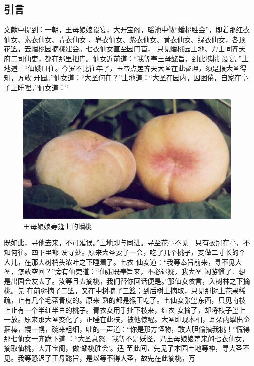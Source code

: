 \documentclass[a4paper,11pt,onecolumn,twoside]{article}
\begin{document}
\begin{CJK*}{GBK}{song}
\begin{multicols}{2}
\section{引言}
文献\supercite{Wu,Xuan}中提到：一朝，王母娘娘设宴，大开宝阁，瑶池中做“蟠桃胜会”，即着那红衣仙女、素衣仙女、青衣仙女
、皂衣仙女、紫衣仙女、黄衣仙女、绿衣仙女，各顶花篮，去蟠桃园摘桃建会。七衣仙女直至园门首，
只见蟠桃园土地、力士同齐天府二司仙吏，都在那里把门。仙女近前道：“我等奉王母懿旨，到此携桃
设宴。”土地道：“仙娥且住。今岁不比往年了，玉帝点差齐天大圣在此督理，须是报大圣得知，方敢
开园。”仙女道：“大圣何在？”土地道：“大圣在园内，因困倦，自家在亭子上睡哩。”仙女道：“
\begin{figure}
\centering
\includegraphics[width=12cm]{Pantao.jpg}
\caption{王母娘娘寿筵上的蟠桃}\label{fig2}
\end{figure}
既如此，寻他去来，不可延误。”土地即与同进。寻至花亭不见，只有衣冠在亭，不知何往。四下里都
没寻处。原来大圣耍了一会，吃了几个桃子，变做二寸长的个人儿，在那大树梢头浓叶之下睡着了。七衣
仙女道：“我等奉旨前来，寻不见大圣，怎敢空回？”旁有仙吏道：“仙娥既奉旨来，不必迟疑。我大圣
闲游惯了，想是出园会友去了。汝等且去摘桃，我们替你回话便是。”那仙女依言，入树林之下摘桃。先
在前树摘了二篮，又在中树摘了三篮；到后树上摘取，只见那树上花果稀疏，止有几个毛蒂青皮的。原来
熟的都是猴王吃了。七仙女张望东西，只见南枝上止有一个半红半白的桃子。青衣女用手扯下枝来，红衣
女摘了，却将枝子望上一放。原来那大圣变化了，正睡在此枝，被他惊醒。大圣即现本相，耳朵内掣出金
箍棒，幌一幌，碗来粗细，咄的一声道：“你是那方怪物，敢大胆偷摘我桃！”慌得那七仙女一齐跪下道
：“大圣息怒。我等不是妖怪，乃王母娘娘差来的七衣仙女，摘取仙桃，大开宝阁，做‘蟠桃胜会’。适
至此间，先见了本园土地等神，寻大圣不见。我等恐迟了王母懿旨，是以等不得大圣，故先在此摘桃，万

\end{multicols}
\end{CJK*}
\end{document}
